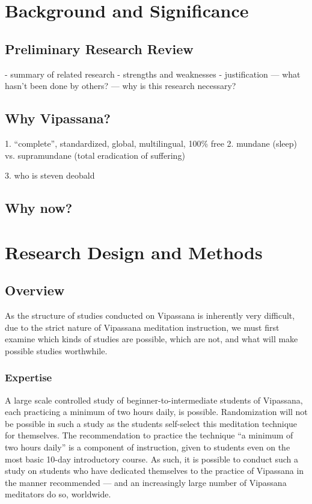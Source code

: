 \documentclass[a4paper, amsfonts, amssymb, amsmath, reprint, showkeys, nofootinbib, twoside]{revtex4-1}
\begin{document}
\section{Background and Significance}

\subsection{Preliminary Research Review}
- summary of related research
- strengths and weaknesses
- justification
--- what hasn't been done by others?
--- why is this research necessary?

\subsection{Why Vipassana?}

1. ``complete'', standardized, global, multilingual, 100\% free
2. mundane (sleep) vs. supramundane (total eradication of suffering)



3. who is steven deobald

\subsection{Why now?}

\section{Research Design and Methods}

\subsection{Overview}

As the structure of studies conducted on Vipassana is inherently very difficult, due to
the strict nature of Vipassana meditation instruction, we must first examine which kinds of
studies are possible, which are not, and what will make possible studies worthwhile.

\subsubsection{Expertise}

A large scale controlled study of beginner-to-intermediate
students of Vipassana, each practicing a minimum of two hours daily, is
possible. Randomization will not be possible in such a study as the students
self-select this meditation technique for themselves. The recommendation to practice
the technique ``a minimum of two hours daily'' is a component of instruction, given
to students even on the most basic 10-day introductory
course. \cite{dhammaorg2017guidelines,goenka2001importance} As such, it is possible
to conduct such a study on students who have dedicated themselves to the practice of
Vipassana in the manner recommended --- and an increasingly large number of Vipassana
meditators do so, worldwide.
\end{document}
